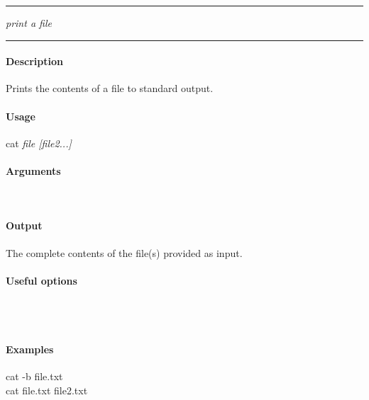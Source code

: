\hrule
\vspace{1mm}
%
    {\emph{print a file}}{}
\hrule
\vspace{4mm}

\paragraph{Description}
\indentpar \raggedright \textrm{Prints the contents of a file to standard output.}\\

\paragraph{Usage}
\indentpar cat \textit{file [file2...]}

\paragraph{Arguments}
\indentpar {}\\
\indentpar {}

\paragraph{Output}
\indentpar \textrm{The complete contents of the file(s) provided as input.}

\paragraph{Useful options}
\indentpar {}\\
\indentpar {}\\
\indentpar {}


\paragraph{Examples}

\indentpar cat -b file.txt\\
\indentpar cat file.txt file2.txt

\vspace{20mm}
